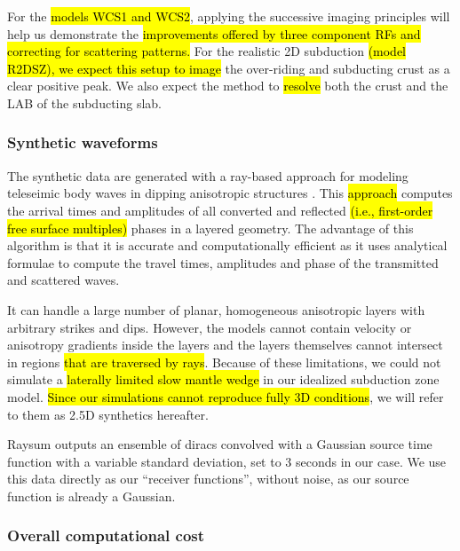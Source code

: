 \documentclass[10pt,a4paper]{article}
\begin{document}
For the \hl{models WCS1 and WCS2}, applying the successive imaging principles will help us demonstrate the \hl{improvements offered by three component RFs and correcting for scattering patterns.}
For the realistic 2D subduction \hl{(model R2DSZ), we expect this setup to image} the over-riding and subducting crust as a clear positive peak.
We also expect the method to \hl{resolve} both the crust and the LAB of the subducting slab.

\subsubsection{Synthetic waveforms}

The synthetic data are generated with a ray-based approach for modeling teleseimic body waves in dipping anisotropic structures \citep[Raysum software,][]{fred_gji_00}.
This \hl{approach} computes the arrival times and amplitudes of all converted and reflected \hl{(i.e., first-order free surface multiples)} phases in a layered geometry.
The advantage of this algorithm is that it is accurate and computationally efficient as it uses analytical formulae to compute the travel times, amplitudes and phase of the transmitted and scattered waves.

It can handle a large number of planar, homogeneous anisotropic layers with arbitrary strikes and dips.
However, the models cannot contain velocity or anisotropy gradients inside the layers and the layers themselves cannot intersect in regions \hl{that are traversed by rays}.
Because of these limitations, we could not simulate a \hl{laterally limited slow mantle wedge} in our idealized subduction zone model.
\hl{Since our simulations cannot reproduce fully 3D conditions}, we will refer to them as 2.5D synthetics hereafter.

Raysum outputs an ensemble of diracs convolved with a Gaussian source time function with a variable standard deviation, set to 3 seconds in our case.
We use this data directly as our “receiver functions”, without noise, as our source function is already a Gaussian.

\subsubsection{Overall computational cost}
\end{document}
